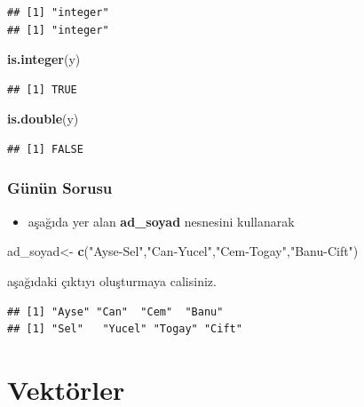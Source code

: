 \documentclass[
  oneside]{book}
\newenvironment{Shaded}{\begin{snugshade}}{\end{snugshade}}
\newcommand{\FunctionTok}[1]{\textcolor[rgb]{0.13,0.29,0.53}{\textbf{#1}}}
\newcommand{\NormalTok}[1]{#1}
\newcommand{\OtherTok}[1]{\textcolor[rgb]{0.56,0.35,0.01}{#1}}
\newcommand{\StringTok}[1]{\textcolor[rgb]{0.31,0.60,0.02}{#1}}
\providecommand{\tightlist}{%
  \setlength{\itemsep}{0pt}\setlength{\parskip}{0pt}}
\begin{document}
\begin{verbatim}
## [1] "integer"
## [1] "integer"
\end{verbatim}

\begin{Shaded}
\begin{Highlighting}[]
\FunctionTok{is.integer}\NormalTok{(y)}
\end{Highlighting}
\end{Shaded}

\begin{verbatim}
## [1] TRUE
\end{verbatim}

\begin{Shaded}
\begin{Highlighting}[]
\FunctionTok{is.double}\NormalTok{(y)}
\end{Highlighting}
\end{Shaded}

\begin{verbatim}
## [1] FALSE
\end{verbatim}

\hypertarget{guxfcnuxfcn-sorusu-1}{%
\subsection{Günün Sorusu}\label{guxfcnuxfcn-sorusu-1}}

\begin{itemize}
\tightlist
\item
  aşağıda yer alan \textbf{ad\_soyad} nesnesini kullanarak
\end{itemize}

\begin{Shaded}
\begin{Highlighting}[]
\NormalTok{ad\_soyad}\OtherTok{\textless{}{-}} \FunctionTok{c}\NormalTok{(}\StringTok{"Ayse{-}Sel"}\NormalTok{,}\StringTok{"Can{-}Yucel"}\NormalTok{,}\StringTok{"Cem{-}Togay"}\NormalTok{,}\StringTok{"Banu{-}Cift"}\NormalTok{)}
\end{Highlighting}
\end{Shaded}

aşağıdaki çıktıyı oluşturmaya calisiniz.

\begin{verbatim}
## [1] "Ayse" "Can"  "Cem"  "Banu"
## [1] "Sel"   "Yucel" "Togay" "Cift"
\end{verbatim}

\hypertarget{vektuxf6rler}{%
\chapter{Vektörler}\label{vektuxf6rler}}
\end{document}
